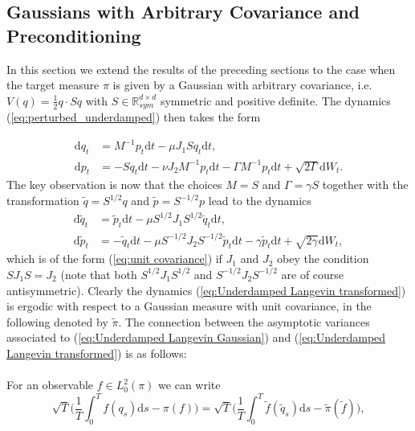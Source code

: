 \subsection{Gaussians with Arbitrary Covariance and Preconditioning}
\label{sec:arbitrary covariance}

In this section we  extend the results of the preceding sections to the case
when the target measure $\pi$ is given by a Gaussian with arbitrary
covariance, i.e. $V(q)=\frac{1}{2}q\cdot Sq$ with $S\in\mathbb{R}_{sym}^{d\times d}$ symmetric and positive definite. The
dynamics (\ref{eq:perturbed_underdamped}) then takes the
form 

\begin{align}
\mathrm{d}q_{t} & =M^{-1}p_{t}\mathrm{d}t-\mu J_{1}Sq_{t}\mathrm{d}t\nonumber, \\
\mathrm{d}p_{t} & =-Sq_{t}\mathrm{d}t-\nu J_{2}M^{-1}p_{t}\mathrm{d}t-\Gamma M^{-1}p_{t}\mathrm{d}t+\sqrt{2\Gamma}\mathrm{d}W_{t}.\label{eq:Underdamped Langevin Gaussian}
\end{align}
The key observation is now that the choices $M=S$ and $\Gamma=\gamma S$
together with the transformation $\widetilde{q}=S^{1/2}q$ and $\widetilde{p}=S^{-1/2}p$
lead to the dynamics
\begin{align}
\mathrm{d}\widetilde{q}_{t} & =\widetilde{p}_{t}\mathrm{d}t-\mu S^{1/2}J_{1}S^{1/2}\widetilde{q}_{t}\mathrm{d}t,\nonumber \\
\mathrm{d}\widetilde{p}_{t} & =-\widetilde{q}_{t}\mathrm{d}t-\mu S^{-1/2}J_{2}S^{-1/2}\widetilde{p}_{t}\mathrm{d}t-\gamma\widetilde{p}_{t}\mathrm{d}t+\sqrt{2\gamma}\mathrm{d}W_{t},\label{eq:Underdamped Langevin transformed}
\end{align}
which is of the form (\ref{eq:unit covariance}) if $J_{1}$ and
$J_{2}$ obey the condition $SJ_{1}S=J_{2}$ (note that both $S^{1/2}J_{1}S^{1/2}$
and $S^{-1/2}J_{2}S^{-1/2}$ are of course antisymmetric). Clearly
the dynamics (\ref{eq:Underdamped Langevin transformed}) is ergodic
with respect to a Gaussian measure with unit covariance, in the following
denoted by $\widetilde{\pi}$. The connection between the asymptotic variances
associated to (\ref{eq:Underdamped Langevin Gaussian}) and (\ref{eq:Underdamped Langevin transformed})
is as follows: 
\\\\
For an observable $f\in L_{0}^{2}(\pi)$ we can write 
\[
\sqrt{T}\bigg(\frac{1}{T}\int_{0}^{T}f(q_{s})\mathrm{d}s-\pi(f)\bigg)=\sqrt{T}\bigg(\frac{1}{T}\int_{0}^{T}\widetilde{f}(\widetilde{q}_{s})\mathrm{d}s-\widetilde{\pi}(\widetilde{f})\bigg),
\]
